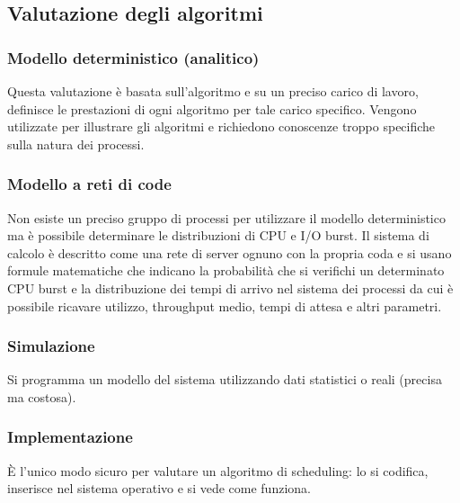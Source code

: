 \subsection{Valutazione degli algoritmi}
\subsubsection{Modello deterministico (analitico)}
Questa valutazione \`e basata sull'algoritmo e su un preciso carico di lavoro, definisce le prestazioni di ogni algoritmo per tale carico specifico. Vengono utilizzate per illustrare 
gli algoritmi e richiedono conoscenze troppo specifiche sulla natura dei processi. 
\subsubsection{Modello a reti di code}
Non esiste un preciso gruppo di processi per utilizzare il modello deterministico ma \`e possibile determinare le distribuzioni di CPU e I/O burst. Il sistema di calcolo \`e descritto 
come una rete di server ognuno con la propria coda e si usano formule matematiche che indicano la probabilit\`a che si verifichi un determinato CPU burst e la distribuzione dei 
tempi di arrivo nel sistema dei processi da cui \`e possibile ricavare utilizzo, throughput medio, tempi di attesa e altri parametri. 
\subsubsection{Simulazione}
Si programma un modello del sistema utilizzando dati statistici o reali (precisa ma costosa).
\subsubsection{Implementazione}
\`E l'unico modo sicuro per valutare un algoritmo di scheduling: lo si codifica, inserisce nel sistema operativo e si vede come funziona. 
